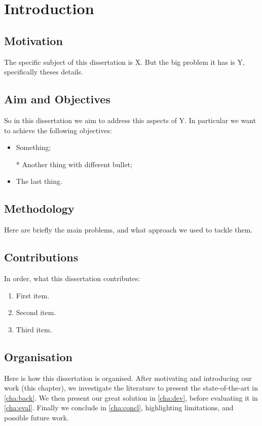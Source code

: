 \chapter{Introduction}
\label{cha:intro}

\section{Motivation}
\label{sec:intro_motiv}

The specific subject of this dissertation is X. But the big problem it has is Y, specifically theses details.

\section{Aim and Objectives}
\label{sec:intro_aim}

So in this dissertation we aim to address this aspects of Y. In particular we want to achieve the following objectives:
\begin{itemize}
    \item Something;
    \item [*] Another thing with different bullet;
    \item The last thing.
\end{itemize}

\section{Methodology}
\label{sec:intro_method}

Here are briefly the main problems, and what approach we used to tackle them.

\section{Contributions}
\label{sec:intro_contrib}

In order, what this dissertation contributes:
\begin{enumerate}
    \item First item.
    \item Second item.
    \item Third item.
\end{enumerate}

\section{Organisation}
\label{sec:intro_orga}

Here is how this dissertation is organised. After motivating and introducing our work (this chapter), we investigate the literature to present the state-of-the-art in \cref{cha:back}. We then present our great solution in \cref{cha:dev}, before evaluating it in \cref{cha:eval}. Finally we conclude in \cref{cha:concl}, highlighting limitations, and possible future work.